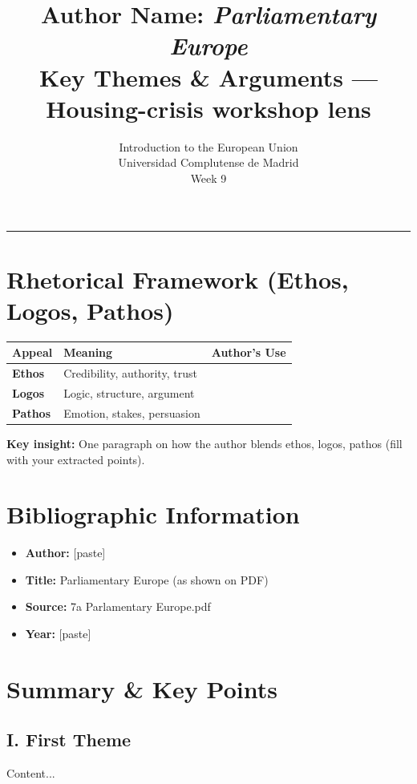 \documentclass[11pt,a4paper]{article}
\begin{document}
\title{Author Name: \textit{Parliamentary Europe}\\Key Themes \& Arguments --- Housing-crisis workshop lens}
\author{Introduction to the European Union\\Universidad Complutense de Madrid\\Week 9}
\date{}
\maketitle
\vspace{-1em}
\hrule
\vspace{1em}

\section*{Rhetorical Framework (Ethos, Logos, Pathos)}
\begin{table}[h]
\centering
\begin{tabular}{@{}lll@{}}
\toprule
\textbf{Appeal} & \textbf{Meaning} & \textbf{Author's Use} \\
\midrule
\textbf{Ethos} & Credibility, authority, trust & \\
\textbf{Logos} & Logic, structure, argument & \\
\textbf{Pathos} & Emotion, stakes, persuasion & \\
\bottomrule
\end{tabular}
\end{table}

\textbf{Key insight:} One paragraph on how the author blends ethos, logos, pathos (fill with your extracted points).

\section*{Bibliographic Information}
\begin{itemize}
\item \textbf{Author:} [paste]
\item \textbf{Title:} Parliamentary Europe (as shown on PDF)
\item \textbf{Source:} 7a Parlamentary Europe.pdf
\item \textbf{Year:} [paste]
\end{itemize}

\section*{Summary & Key Points}
\subsection*{I. First Theme}
Content...
\end{document}
